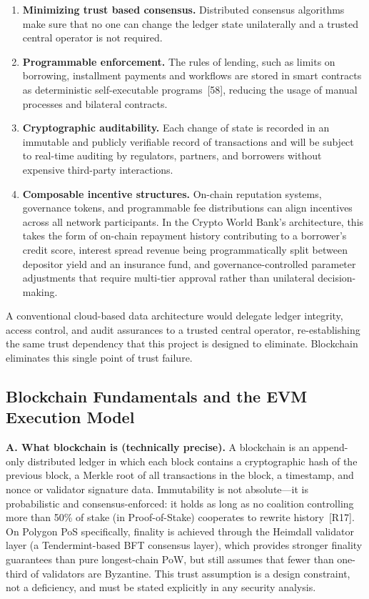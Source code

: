 \documentclass[12pt,a4paper]{report}
\begin{document}
\begin{enumerate}[noitemsep]
\item \textbf{Minimizing trust based consensus.} Distributed consensus algorithms make sure that no one can change the ledger state unilaterally and a trusted central operator is not required.

\item \textbf{Programmable enforcement.} The rules of lending, such as limits on borrowing, installment payments and workflows are stored in smart contracts as deterministic self-executable programs~[58], reducing the usage of manual processes and bilateral contracts.

\item \textbf{Cryptographic auditability.} Each change of state is recorded in an immutable and publicly verifiable record of transactions and will be subject to real-time auditing by regulators, partners, and borrowers without expensive third-party interactions.

\item \textbf{Composable incentive structures.} On-chain reputation systems, governance tokens, and programmable fee distributions can align incentives across all network participants. In the Crypto World Bank's architecture, this takes the form of on-chain repayment history contributing to a borrower's credit score, interest spread revenue being programmatically split between depositor yield and an insurance fund, and governance-controlled parameter adjustments that require multi-tier approval rather than unilateral decision-making.
\end{enumerate}

A conventional cloud-based data architecture would delegate ledger integrity, access control, and audit assurances to a trusted central operator, re-establishing the same trust dependency that this project is designed to eliminate. Blockchain eliminates this single point of trust failure.

\subsection{Blockchain Fundamentals and the EVM Execution Model}

\textbf{A. What blockchain is (technically precise).}
A blockchain is an append-only distributed ledger in which each block contains a cryptographic hash of the previous block, a Merkle root of all transactions in the block, a timestamp, and nonce or validator signature data. Immutability is not absolute---it is probabilistic and consensus-enforced: it holds as long as no coalition controlling more than 50\% of stake (in Proof-of-Stake) cooperates to rewrite history~[R17]. On Polygon PoS specifically, finality is achieved through the Heimdall validator layer (a Tendermint-based BFT consensus layer), which provides stronger finality guarantees than pure longest-chain PoW, but still assumes that fewer than one-third of validators are Byzantine. This trust assumption is a design constraint, not a deficiency, and must be stated explicitly in any security analysis.
\end{document}
